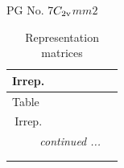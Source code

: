 \documentclass[fleqn,8pt,landscape]{jsarticle}
\begin{document}
\setcounter{MaxMatrixCols}{32}

\renewcommand{\tablename}{Table~}
\renewcommand{\figurename}{Figure~}
\begin{center}
\LARGE
PG No. 7\quad$C_{\rm 2v}$\quad$mm2$\quad[ orthorhombic ]
\end{center}
\renewcommand{\arraystretch}{1.2}
\begin{longtable}{ccccccc}
\caption{Representation matrices}
 \\
 \hline \hline
Irrep. &  &  &  &  &  &  \\ \hline \endfirsthead

\multicolumn{6}{l}{\tablename\ \thetable{}} \\
 \hline \hline
Irrep. &  &  &  &  &  &  \\ \hline \endhead

 \hline \hline
\multicolumn{6}{r}{\footnotesize\it continued ...} \\ \endfoot

 \hline \hline
\multicolumn{6}{r}{} \\ \endlastfoot


\end{longtable}
\end{document}
